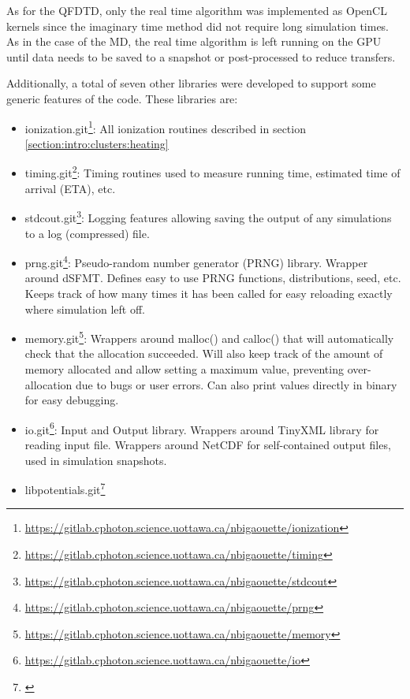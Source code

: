 As for the QFDTD, only the real time algorithm was implemented as OpenCL
kernels since the imaginary time method did not require long simulation times.
As in the case of the MD, the real time algorithm is left running on the GPU
until data needs to be saved to a snapshot or post-processed to reduce
transfers.





Additionally, a total of seven other libraries were developed to support some
generic features of the code. These libraries are:
\begin{itemize}
\item ionization.git\footnote{ \url{
    https://gitlab.cphoton.science.uottawa.ca/nbigaouette/ionization}}:
    All ionization routines described in section
    \ref{section:intro:clusters:heating}
\item timing.git\footnote{ \url{
    https://gitlab.cphoton.science.uottawa.ca/nbigaouette/timing}}:
    Timing routines used to measure running time, estimated time of arrival
(ETA), etc.
\item stdcout.git\footnote{ \url{
    https://gitlab.cphoton.science.uottawa.ca/nbigaouette/stdcout}}:
    Logging features allowing saving the output of any simulations to a log
    (compressed) file.
\item prng.git\footnote{ \url{
    https://gitlab.cphoton.science.uottawa.ca/nbigaouette/prng}}:
    Pseudo-random number generator (PRNG) library. Wrapper around
dSFMT\cite{prng2009}. Defines easy to use PRNG functions, distributions, seed,
etc. Keeps track of how many times it has been called for easy reloading
exactly where simulation left off.
\item memory.git\footnote{ \url{
    https://gitlab.cphoton.science.uottawa.ca/nbigaouette/memory}}:
    Wrappers around malloc() and calloc() that will automatically check that
    the allocation succeeded. Will also keep track of the amount of
    memory allocated and allow setting a maximum value, preventing
    over-allocation due to bugs or user errors. Can also print values directly
    in binary for easy debugging.
\item io.git\footnote{ \url{
    https://gitlab.cphoton.science.uottawa.ca/nbigaouette/io}}:
    Input and Output library. Wrappers around TinyXML library\cite{tinyxml} for
reading input file. Wrappers around NetCDF\cite{netcdf} for self-contained
output files, used in simulation snapshots.
\item libpotentials.git\footnote{ \url{
}}
\end{itemize}
